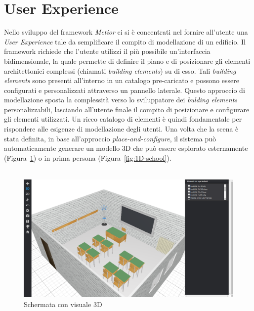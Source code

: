 \section{User Experience}
\label{sec:chapter_2_section_1}

Nello sviluppo del framework \emph{Metior} ci si è concentrati nel fornire all'utente una \emph{User Experience} tale
da semplificare il compito di modellazione di un edificio.
Il framework richiede che l'utente utilizzi il più possibile un'interfaccia bidimensionale, la quale permette
di definire il piano e di posizionare gli elementi architettonici complessi (chiamati \emph{building elements}) su di esso.
Tali \emph{building elements} sono presenti all'interno in un catalogo pre-caricato e possono essere
configurati e personalizzati attraverso un pannello laterale. Questo approccio
di modellazione sposta la complessità verso lo sviluppatore dei \emph{bulding elements} personalizzabili,
lasciando all'utente finale il compito di posizionare e configurare gli elementi utilizzati.
Un ricco catalogo di elementi \`e quindi fondamentale per rispondere alle esigenze di modellazione degli utenti.
Una volta che la scena \`e stata definita, in base all'approccio \emph{place-and-configure}, il sistema può automaticamente
generare un modello 3D che pu\`o essere esplorato esternamente (Figura~\ref{fig:3D-school}) o
in prima persona (Figura~\ref{fig:1D-school}).\\\\

\begin{figure}[htbp] %
   \centering
   \includegraphics[width=1\linewidth]{images/3d-school}
   \caption{Schermata con visuale 3D}
   \label{fig:3D-school}
\end{figure}

